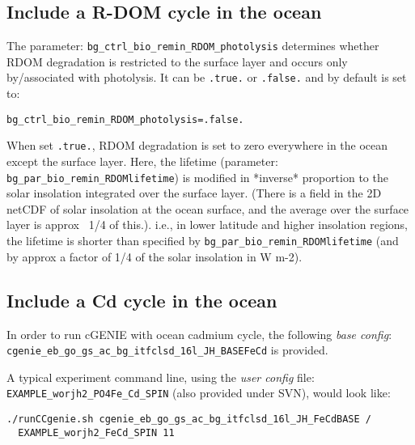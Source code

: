 \documentclass[11pt,fleqn]{book} %
\begin{document}
%
\newpage
\subsection*{Include a R-DOM cycle in the ocean}
\vspace{1mm}

The parameter: \texttt{bg\_ctrl\_bio\_remin\_RDOM\_photolysis} determines whether RDOM degradation is restricted to the surface layer and occurs only by/associated with photolysis. It can be \texttt{.true.} or \texttt{.false.} and by default is set to:
\vspace{-2pt}\begin{verbatim}
bg_ctrl_bio_remin_RDOM_photolysis=.false.
\end{verbatim}\vspace{-2pt}
When set \texttt{.true.}, RDOM degradation is set to zero everywhere in the ocean except the surface layer. Here, the lifetime (parameter: \texttt{bg\_par\_bio\_remin\_RDOMlifetime}) is modified in *inverse* proportion to the solar insolation integrated over the surface layer. (There is a field in the 2D netCDF of solar insolation at the ocean surface, and the average over the surface layer is approx ~1/4 of this.). i.e., in lower latitude and higher insolation regions, the lifetime is shorter than specified by \texttt{bg\_par\_bio\_remin\_RDOMlifetime} (and by approx a factor of 1/4 of the solar insolation in W m-2).

%
\newpage
\subsection*{Include a Cd cycle in the ocean}
\vspace{1mm}

In order to run cGENIE with ocean cadmium cycle, the following \textit{base config}: \\
\texttt{cgenie\_eb\_go\_gs\_ac\_bg\_itfclsd\_16l\_JH\_BASEFeCd} is provided.

A typical experiment command line, using the \textit{user config} file: \texttt{EXAMPLE\_worjh2\_PO4Fe\_Cd\_SPIN} (also provided under SVN), would look like:
\vspace{-4pt}\begin{verbatim}
./runCCgenie.sh cgenie_eb_go_gs_ac_bg_itfclsd_16l_JH_FeCdBASE /
  EXAMPLE_worjh2_FeCd_SPIN 11
\end{verbatim}\vspace{-4pt}
\end{document}
